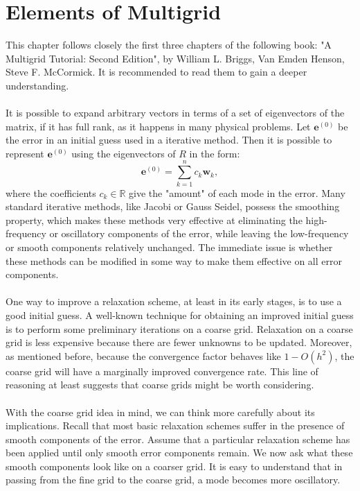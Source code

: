\documentclass[11pt]{book}
\begin{document}
\chapter{Elements of Multigrid}
This chapter follows closely the first three chapters of the following book: "A Multigrid Tutorial: Second Edition", by  William L. Briggs, Van Emden Henson, Steve F. McCormick. It is recommended to read them to gain a deeper understanding.
\\ \\
It is possible to expand arbitrary vectors in terms of a set of eigenvectors of the  matrix, if it has full rank, as it happens in many physical problems.
Let $\textbf{e}^{(0)}$ be the error in an initial guess used in a iterative method. Then
it is possible to represent $\textbf{e}^{(0)}$
 using the eigenvectors of $R$ in the form:
 $$\textbf{e}^{(0)} = \sum_{k=1}^{n} c_k \textbf{w}_{k},$$
 where the coefficients $c_k \in \mathbb{R}$  give the "amount" of each mode in the error.
 Many standard iterative methods, like Jacobi or Gauss Seidel, possess the smoothing property, which makes these methods very effective at eliminating the high-frequency or oscillatory components of the error, while leaving the low-frequency or smooth components relatively unchanged. The immediate issue is whether these methods can be modified in some way to make them effective on all error components.\\ \\
One way to improve a relaxation scheme, at least in its early stages, is to use a good initial guess. A well-known technique for obtaining an improved initial guess is to perform some preliminary iterations on a coarse grid. Relaxation on a coarse grid is less expensive because there are fewer unknowns to be updated. Moreover, as mentioned before, because the convergence factor behaves like $1-O\left(h^{2}\right)$, the coarse grid will have a marginally improved convergence rate. This line of reasoning at least suggests that coarse grids might be worth considering.\\ \\
With the coarse grid idea in mind, we can think more carefully about its implications. Recall that most basic relaxation schemes suffer in the presence of smooth components of the error. Assume that a particular relaxation scheme has been applied until only smooth error components remain.  We now ask what these smooth
components look like on a coarser grid. It is easy to understand that 
in passing from the fine grid to the coarse grid, a mode becomes more oscillatory.\\ \\
\end{document}
